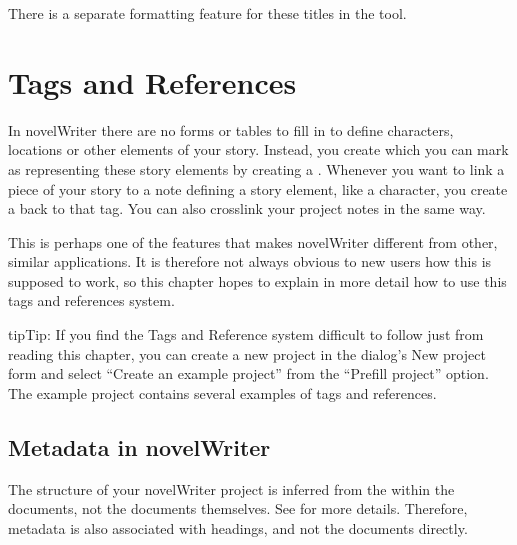 \documentclass[a4paper,11pt,english]{sphinxmanual}
\begin{document}
\sphinxAtStartPar
There is a separate formatting feature for these titles in the  tool.

\sphinxAtStartPar
{}

\sphinxstepscope


\chapter{Tags and References}
\label{\detokenize{project_references:tags-and-references}}\label{\detokenize{project_references:a-references}}\label{\detokenize{project_references::doc}}
\sphinxAtStartPar
In novelWriter there are no forms or tables to fill in to define characters, locations or other
elements of your story. Instead, you create {\hyperref[\detokenize{int_glossary:term-Project-Notes}]{}} which you can mark as
representing these story elements by creating a {\hyperref[\detokenize{int_glossary:term-Tag}]{}}. Whenever you want to link a piece of
your story to a note defining a story element, like a character, you create a {\hyperref[\detokenize{int_glossary:term-Reference}]{}}
back to that tag. You can also cross\sphinxhyphen{}link your project notes in the same way.

\sphinxAtStartPar
This is perhaps one of the features that makes novelWriter different from other, similar
applications. It is therefore not always obvious to new users how this is supposed to work, so
this chapter hopes to explain in more detail how to use this tags and references system.

\begin{sphinxadmonition}{tip}{Tip:}
\sphinxAtStartPar
If you find the Tags and Reference system difficult to follow just from reading this chapter,
you can create a new project in the  dialog’s New project form and select  “Create an
example project” from the “Pre\sphinxhyphen{}fill project” option. The example project contains several
examples of tags and references.
\end{sphinxadmonition}


\section{Metadata in novelWriter}
\label{\detokenize{project_references:metadata-in-novelwriter}}\label{\detokenize{project_references:a-references-metadata}}
\sphinxAtStartPar
The structure of your novelWriter project is inferred from the {\hyperref[\detokenize{int_glossary:term-Headings}]{}} within the
documents, not the documents themselves. See {\hyperref[\detokenize{project_structure:a-struct-heads}]{}} for more details. Therefore,
metadata is also associated with headings, and not the documents directly.
\end{document}
